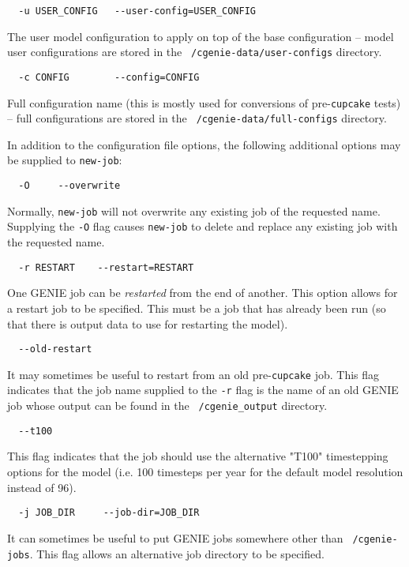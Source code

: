 \documentclass[a4paper,10pt,article]{memoir}
\begin{document}
\begin{verbatim}
  -u USER_CONFIG   --user-config=USER_CONFIG
\end{verbatim}
The user model configuration to apply on top of the base configuration
-- model user configurations are stored in the
\texttt{~/cgenie-data/user-configs} directory.

\begin{verbatim}
  -c CONFIG        --config=CONFIG
\end{verbatim}
Full configuration name (this is mostly used for conversions of
pre-\texttt{cupcake} tests) -- full configurations are stored in the
\texttt{~/cgenie-data/full-configs} directory.

In addition to the configuration file options, the following
additional options may be supplied to \texttt{new-job}:

\begin{verbatim}
  -O     --overwrite
\end{verbatim}
Normally, \texttt{new-job} will not overwrite any existing job of the
requested name.  Supplying the \texttt{-O} flag causes
\texttt{new-job} to delete and replace any existing job with the
requested name.

\begin{verbatim}
  -r RESTART    --restart=RESTART
\end{verbatim}
One GENIE job can be \emph{restarted} from the end of another.  This
option allows for a restart job to be specified.  This must be a job
that has already been run (so that there is output data to use for
restarting the model).

\begin{verbatim}
  --old-restart
\end{verbatim}
It may sometimes be useful to restart from an old pre-\texttt{cupcake}
job.  This flag indicates that the job name supplied to the
\texttt{-r} flag is the name of an old GENIE job whose output can be
found in the \texttt{~/cgenie\_output} directory.

\begin{verbatim}
  --t100
\end{verbatim}
This flag indicates that the job should use the alternative "T100"
timestepping options for the model (i.e. 100 timesteps per year for
the default model resolution instead of 96).

\begin{verbatim}
  -j JOB_DIR     --job-dir=JOB_DIR
\end{verbatim}
It can sometimes be useful to put GENIE jobs somewhere other than
\texttt{~/cgenie-jobs}.  This flag allows an alternative job directory
to be specified.
\end{document}
